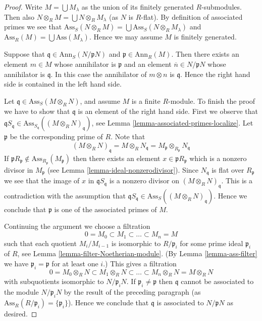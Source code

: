 \begin{proof}
Write $M = \bigcup M_\lambda$ as the union of its finitely generated
$R$-submodules. Then also $N \otimes_R M = \bigcup N \otimes_R M_\lambda$
(as $N$ is $R$-flat). By definition of associated primes we see that
$\text{Ass}_S(N \otimes_R M) = \bigcup \text{Ass}_S(N \otimes_R M_\lambda)$
and $\text{Ass}_R(M) = \bigcup \text{Ass}(M_\lambda)$. Hence we may assume
$M$ is finitely generated.

\medskip\noindent
Suppose that $\mathfrak q \in \text{Ann}_S(N/\mathfrak pN)$ and
$\mathfrak p \in \text{Ann}_R(M)$. Then there exists an
element $m \in M$ whose annihilator is $\mathfrak p$ and an
element $\overline{n} \in N/\mathfrak pN$ whose annihilator
is $\mathfrak q$. In this case the annihilator
of $m \otimes n$ is $\mathfrak q$. Hence the right hand side is
contained in the left hand side.

\medskip\noindent
Let $\mathfrak q \in \text{Ass}_S(M \otimes_R N)$, and assume $M$
is a finite $R$-module. To finish the proof we have to show that
$\mathfrak q$ is an element of the right hand side. First we observe that
$\mathfrak qS_{\mathfrak q} \in
\text{Ass}_{S_{\mathfrak q}}((M \otimes_R N)_{\mathfrak q})$,
see Lemma \ref{lemma-associated-primes-localize}.
Let $\mathfrak p$ be the corresponding prime of $R$.
Note that
$$
(M \otimes_R N)_{\mathfrak q} = M \otimes_R N_{\mathfrak q}
= M_{\mathfrak p} \otimes_{R_{\mathfrak p}} N_{\mathfrak q}
$$
If
$\mathfrak pR_{\mathfrak p} \not \in
\text{Ass}_{R_{\mathfrak p}}(M_{\mathfrak p})$
then there exists an element $x \in \mathfrak pR_{\mathfrak p}$ which
is a nonzero divisor in $M_{\mathfrak p}$ (see
Lemma \ref{lemma-ideal-nonzerodivisor}). Since
$N_{\mathfrak q}$ is flat over $R_{\mathfrak p}$ we see that
the image of $x$ in $\mathfrak qS_{\mathfrak q}$ is a nonzero divisor on 
$(M \otimes_R N)_{\mathfrak q}$. This is a contradiction
with the assumption that
$\mathfrak qS_{\mathfrak q} \in \text{Ass}_S((M \otimes_R N)_{\mathfrak q})$.
Hence we conclude that $\mathfrak p$ is one of the associated
primes of $M$.

\medskip\noindent
Continuing the argument we choose a filtration
$$
0 = M_0 \subset M_1 \subset \ldots \subset M_n = M
$$
such that each quotient $M_i/M_{i-1}$ is isomorphic
to $R/\mathfrak p_i$ for some prime ideal $\mathfrak p_i$
of $R$, see Lemma \ref{lemma-filter-Noetherian-module}.
(By Lemma \ref{lemma-ass-filter} we have $\mathfrak p_i = \mathfrak p$ for
at least one $i$.) This gives a filtration
$$
0 = M_0 \otimes_R N \subset M_1 \otimes_R N \subset \ldots
\subset M_n \otimes_R N = M \otimes_R N
$$
with subquotients isomorphic to $N/\mathfrak p_iN$. If
$\mathfrak p_i \not = \mathfrak p$ then $\mathfrak q$ cannot be
associated to the module $N/\mathfrak p_iN$ by the result of the
preceding paragraph (as $\text{Ass}_R(R/\mathfrak p_i) = \{\mathfrak p_i\}$).
Hence we conclude that $\mathfrak q$ is associated to
$N/\mathfrak pN$ as desired.
\end{proof}

